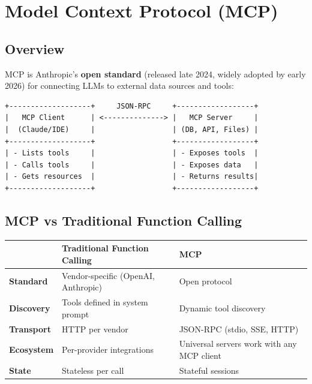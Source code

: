 \documentclass[11pt,a4paper]{article}
\begin{document}
\section{Model Context Protocol (MCP)}

\subsection{Overview}

MCP is Anthropic's \textbf{open standard} (released late 2024, widely adopted by early 2026) for connecting LLMs to external data sources and tools:

\begin{lstlisting}[basicstyle=\ttfamily\small, caption={MCP Architecture}]
+-------------------+     JSON-RPC     +------------------+
|   MCP Client      | <--------------> |   MCP Server     |
|  (Claude/IDE)     |                  | (DB, API, Files) |
+-------------------+                  +------------------+
| - Lists tools     |                  | - Exposes tools  |
| - Calls tools     |                  | - Exposes data   |
| - Gets resources  |                  | - Returns results|
+-------------------+                  +------------------+
\end{lstlisting}

\subsection{MCP vs Traditional Function Calling}

\begin{center}
\begin{tabular}{L{4cm}L{5cm}L{5cm}}
\toprule
& \textbf{Traditional Function Calling} & \textbf{MCP} \\
\midrule
\textbf{Standard} & Vendor-specific (OpenAI, Anthropic) & Open protocol \\
\textbf{Discovery} & Tools defined in system prompt & Dynamic tool discovery \\
\textbf{Transport} & HTTP per vendor & JSON-RPC (stdio, SSE, HTTP) \\
\textbf{Ecosystem} & Per-provider integrations & Universal servers work with any MCP client \\
\textbf{State} & Stateless per call & Stateful sessions \\
\bottomrule
\end{tabular}
\end{center}
\end{document}

